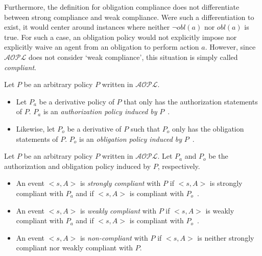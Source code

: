 Furthermore, the definition for obligation compliance does not differentiate between strong compliance and weak compliance.
Were such a differentiation to exist, it would center around instances where neither $\neg obl(a)$ nor $obl(a)$ is true\footnotemark.
For such a case, an obligation policy would not explicitly impose nor explicitly waive an agent from an obligation to perform action $a$.
However, since $\mathcal{AOPL}$ does not consider `weak compliance', this situation is simply called \textit{compliant}.


\begin{definition}
    Let $P$ be an arbitrary policy $P$ written in $\mathcal{AOPL}$.

    \begin{itemize}
        \item Let $P_a$ be a derivative policy of $P$ that only has the authorization statements of $P$.
            $P_a$ is an \textit{authorization policy induced by} $P$~\citep{gelfond_authorization_2008}.
        \item Likewise, let $P_o$ be a derivative of $P$ such that $P_o$ only has the obligation statements of $P$.
            $P_o$ is an \textit{obligation policy induced by} $P$~\citep{gelfond_authorization_2008}.
    \end{itemize}
\end{definition}

\begin{definition}
    Let $P$ be an arbitrary policy $P$ written in $\mathcal{AOPL}$.
    Let $P_a$ and $P_o$ be the authorization and obligation policy induced by $P$, respectively.

    \begin{itemize}
        \item An event $<s, A>$ is \textit{strongly compliant} with $P$ if $<s, A>$ is strongly compliant with $P_a$ and if $<s, A>$ is compliant with $P_o$~\citep{gelfond_authorization_2008}.
        \item An event $<s, A>$ is \textit{weakly compliant} with $P$ if $<s, A>$ is weakly compliant with $P_a$ and if $<s, A>$ is compliant with $P_o$~\citep{gelfond_authorization_2008}.
        \item An event $<s, A>$ is \textit{non-compliant} with $P$ if $<s, A>$ is neither strongly compliant nor weakly compliant with $P$\footnotemark.
    \end{itemize}
\end{definition}


